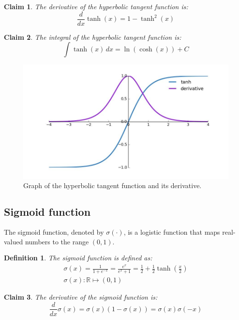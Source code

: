 \documentclass[11pt]{book} %
\newtheorem{definition}{Definition}[section]
\newtheorem*{claim*}{Claim}
\begin{document}
\begin{claim*}
    The derivative of the hyperbolic tangent function is:
    \begin{equation}
        \frac{d}{dx} \tanh(x) = 1 - \tanh^2(x)
    \end{equation}
\end{claim*}

\begin{claim*}
    The integral of the hyperbolic tangent function is:
    \begin{equation}
        \int \tanh(x) \, dx = \ln(\cosh(x)) + C
    \end{equation}
\end{claim*}

\begin{figure}[h]
    \centering
    \includegraphics[width=0.5\linewidth]{Figs/tanh_der.jpeg}
    \caption{Graph of the hyperbolic tangent function and its derivative.}
    \label{fig:tanh_derivative}
\end{figure}


\subsection{Sigmoid function}
The sigmoid function, denoted by \(\sigma(\cdot)\), is a logistic function that maps real-valued numbers to the range \((0, 1)\).

\begin{definition}
    The sigmoid function is defined as:
    \begin{align*}
        \sigma(x) = \frac{1}{1 + e^{-x}}= \frac{e^x}{e^x + 1} = \frac{1}{2} + \frac{1}{2} \tanh\left(\frac{x}{2}\right) \\
        \sigma(x) : \mathbb{R} \mapsto (0, 1)
    \end{align*}
\end{definition}

\begin{claim*}
    The derivative of the sigmoid function is:
    \begin{equation}
        \frac{d}{dx} \sigma(x) = \sigma(x)(1 - \sigma(x)) = \sigma(x) \sigma(-x)
    \end{equation}
\end{claim*}
\end{document}
